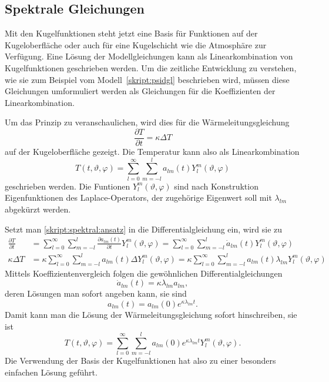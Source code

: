 %
%
%
\subsection{Spektrale Gleichungen\label{subsection:spektrale gleichungen}}
Mit den Kugelfunktionen steht jetzt eine Basis für Funktionen auf der
Kugeloberfläche oder auch für eine Kugelschicht wie die Atmosphäre zur
Verfügung.
Eine Lösung der Modellgleichungen kann als Linearkombination von
Kugelfunktionen geschrieben werden.
Um die zeitliche Entwicklung zu verstehen, wie sie zum Beispiel vom
Modell~\eqref{skript:psidgl} beschrieben wird, müssen diese Gleichungen
umformuliert werden als Gleichungen für die Koeffizienten der
Linearkombination.

Um das Prinzip zu veranschaulichen, wird dies für die Wärmeleitungsgleichung
\[
\frac{\partial T}{\partial t}
=
\kappa \Delta T
\]
auf der Kugeloberfläche gezeigt.
Die Temperatur kann also als Linearkombination
\begin{equation}
T(t, \vartheta, \varphi)
=
\sum_{l=0}^\infty \sum_{m=-l}^{l} a_{lm}(t) Y^m_l(\vartheta,\varphi)
\label{skript:spektral:ansatz}
\end{equation}
geschrieben werden.
Die Funtionen $Y^m_l(\vartheta,\varphi)$ sind nach Konstruktion
Eigenfunktionen des Laplace-Operators, der zugehörige Eigenwert soll
mit $\lambda_{lm}$ abgekürzt werden.

Setzt man \eqref{skript:spektral:ansatz} in die Differentialgleichung
ein, wird sie zu
\begin{align*}
\frac{\partial T}{\partial t}
&=
\sum_{l=0}^\infty \sum_{m=-l}^{l} \frac{\partial a_{lm}(t)}{\partial t} Y^m_l(\vartheta,\varphi)
=
\sum_{l=0}^\infty \sum_{m=-l}^{l} \dot a_{lm}(t) Y^m_l(\vartheta,\varphi)
\\
\kappa\Delta T
&=
\kappa
\sum_{l=0}^\infty \sum_{m=-l}^{l} a_{lm}(t) \Delta Y^m_l(\vartheta,\varphi)
=
\kappa
\sum_{l=0}^\infty \sum_{m=-l}^{l} a_{lm}(t) \lambda_{lm} Y^m_l(\vartheta,\varphi)
\end{align*}
Mittels Koeffizientenvergleich folgen die gewöhnlichen
Differentialgleichungen
\[
\dot a_{lm}(t)
=
\kappa\lambda_{lm}
a_{lm},
\]
deren Lösungen man sofort angeben kann, sie sind
\[
a_{lm}(t)
=
a_{lm}(0) e^{\kappa\lambda_{lm} t}.
\]
Damit kann man die Lösung der Wärmeleitungsgleichung sofort hinschreiben,
sie ist
\begin{equation}
T(t,\vartheta,\varphi)
=
\sum_{l=0}^\infty \sum_{m=-l}^{l}
a_{lm}(0) e^{\kappa\lambda_{lm} t}
Y^m_l(\vartheta,\varphi).
\end{equation}
Die Verwendung der Basis der Kugelfunktionen hat also zu einer besonders 
einfachen Lösung geführt.

